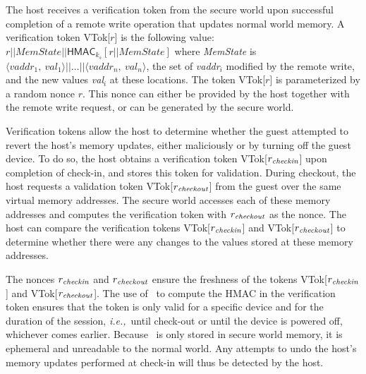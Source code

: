 \documentclass[pageno]{sig-alternate-05-2015}
\newcommand{\ie}{\textit{i.e.,}}
\begin{document}
The host receives a verification token from the secure world upon successful
completion of a remote write operation that updates normal world memory. 
A verification token \textsf{VTok}[$r$] is the following value:
%
%
$
r||\textit{MemState}||\textsf{HMAC}_{k_s}[r||\textit{MemState}]$
%
%
where \textit{MemState} is
$\langle\textit{vaddr}_1,~\textit{val}_1\rangle||\ldots||\langle\textit{vaddr}_n,~\textit{val}_n\rangle$,
the set of \textit{vaddr}$_i$ modified by the remote write, and the new values
\textit{val}$_i$ at these locations. The token \textsf{VTok}[$r$] is
parameterized by a random nonce $r$. This nonce can either be provided by the
host together with the remote write request, or can be generated by the secure
world. 

Verification tokens allow the host to determine whether the guest attempted to
revert the host's memory updates, either maliciously or by turning off the
guest device. To do so, the host obtains a verification token
\textsf{VTok}[$r_{{\it checkin}}$] upon completion of check-in, and stores this
token for validation. During checkout, the host requests a validation token
\textsf{VTok}[$r_{\it checkout}$] from the guest over the same virtual memory
addresses. The secure world accesses each of these memory addresses and
computes the verification token with $r_{\it checkout}$ as the nonce. The host
can compare the verification tokens \textsf{VTok}[$r_{{\it checkin}}$] and
\textsf{VTok}[$r_{{\it checkout}}$] to determine whether there were any changes
to the values stored at these memory addresses. 

The nonces $r_{\it checkin}$ and $r_{\it checkout}$ ensure the freshness of
the tokens
\textsf{VTok}[$r_{{\it checkin}}$] and \textsf{VTok}[$r_{{\it checkout}}$].
The use of \ks\ to compute the HMAC in the verification token ensures that the
token is only valid for a specific device and for the duration of the session,
\ie~until check-out or until the device is powered off, whichever comes
earlier. Because \ks\ is only stored in secure world memory, it is ephemeral
and unreadable to the normal world. Any attempts to undo the host's memory
updates performed at check-in will thus be detected by the host.

\end{document}
